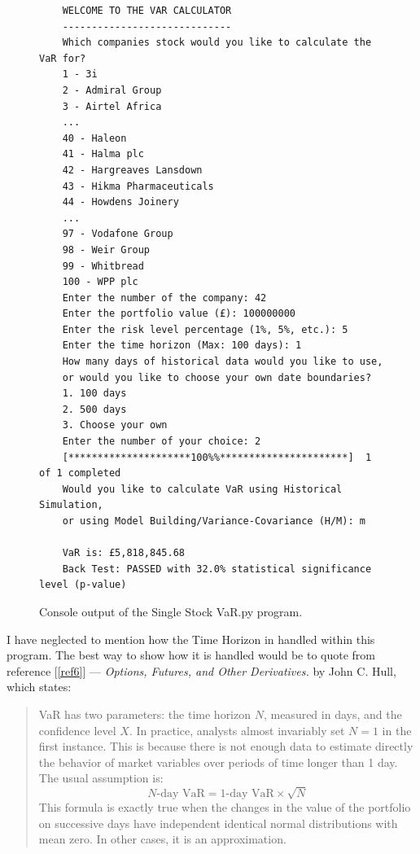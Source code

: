 \documentclass{article}
\begin{document}
\begin{figure}
  \begin{verbatim}
    WELCOME TO THE VAR CALCULATOR
    -----------------------------
    Which companies stock would you like to calculate the VaR for?
    1 - 3i
    2 - Admiral Group
    3 - Airtel Africa
    ...
    40 - Haleon
    41 - Halma plc
    42 - Hargreaves Lansdown
    43 - Hikma Pharmaceuticals
    44 - Howdens Joinery
    ...
    97 - Vodafone Group
    98 - Weir Group
    99 - Whitbread
    100 - WPP plc
    Enter the number of the company: 42
    Enter the portfolio value (£): 100000000
    Enter the risk level percentage (1%, 5%, etc.): 5
    Enter the time horizon (Max: 100 days): 1
    How many days of historical data would you like to use, 
    or would you like to choose your own date boundaries?
    1. 100 days
    2. 500 days
    3. Choose your own
    Enter the number of your choice: 2
    [*********************100%%**********************]  1 of 1 completed
    Would you like to calculate VaR using Historical Simulation, 
    or using Model Building/Variance-Covariance (H/M): m
    
    VaR is: £5,818,845.68
    Back Test: PASSED with 32.0% statistical significance level (p-value)
  \end{verbatim}
  \caption{Console output of the Single Stock VaR.py program.}\label{fig:Single Stock VaR}
\end{figure}

 I have neglected to mention how the Time Horizon in handled within this program. The best way to show how it is handled would be to quote from reference [\ref{ref6}] --- \textit{Options, Futures, and Other Derivatives.} by John C. Hull, which states:

 \begin{quote}
  VaR has two parameters: the time horizon \( N \), measured in days, and the confidence level \( X \). In practice, analysts almost invariably set \( N = 1 \) in the first instance. This is because there is not enough data to estimate directly the behavior of market variables over periods of time longer than 1 day. The usual assumption is: 
  \begin{equation}
    N\text{-day VaR} = \text{1-day VaR} \times \sqrt{N}
    \label{eq:Time Horizon}
  \end{equation}
  This formula is exactly true when the changes in the value of the portfolio on successive days have independent identical normal distributions with mean zero. In other cases, it is an approximation.
\end{quote}
  
\end{document}
